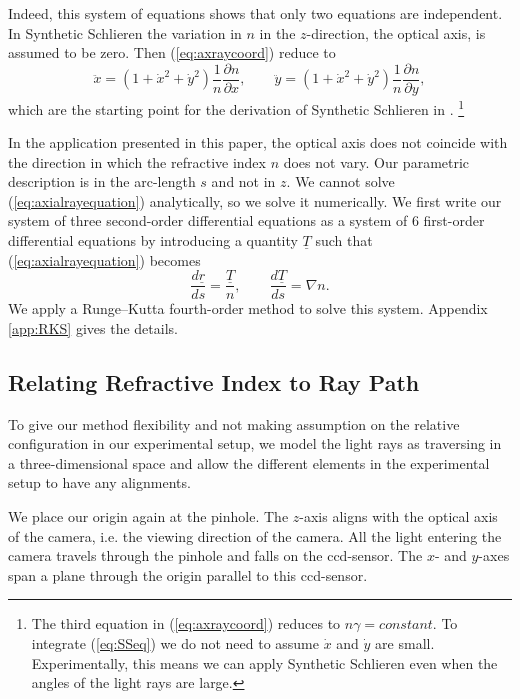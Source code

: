 \documentclass{article}
\begin{document}
Indeed, this system of equations shows that only two equations are independent. In Synthetic Schlieren the variation in $n$ in the $z$-direction, the optical axis, is assumed to be zero. Then (\ref{eq:axraycoord}) reduce to
\begin{equation}
	\label{eq:SSeq}
		\ddot{x} = \left(1+\dot{x}^2+\dot{y}^2\right) \frac{1}{n} \frac{\partial n}{\partial x}, \qquad
		\ddot{y} = \left(1+\dot{x}^2+\dot{y}^2\right) \frac{1}{n} \frac{\partial n}{\partial y},
\end{equation}
which are the starting point for the derivation of Synthetic Schlieren in \cite{dalziel2000whole}.  \footnote{The third equation in (\ref{eq:axraycoord}) reduces to $n \gamma = constant$.  To integrate (\ref{eq:SSeq}) we do not need to assume $\dot{x}$ and $\dot{y}$ are small. Experimentally, this means we can apply Synthetic Schlieren even when the angles of the light rays are large. }

In the application presented in this paper, the optical axis does not coincide with the direction in which the refractive index $n$ does not vary. Our parametric description is in the arc-length $s$ and not in $z$.  We cannot solve (\ref{eq:axialrayequation}) analytically, so we solve it numerically. We first write our system of three second-order differential equations as a system of 6 first-order differential equations by introducing a quantity $\underline{T}$ \cite{southwell1982ray} such that (\ref{eq:axialrayequation}) becomes
\begin{equation}
	\label{eq:sys6foeq}
		\frac{d \underline{r}}{d s} = \frac{\underline{T}}{n}, \qquad
		\frac{d \underline{T}}{d s} = \nabla n.
\end{equation}
We apply a Runge–Kutta fourth-order method to solve this system. Appendix \ref{app:RKS} gives the details.

\subsection{Relating Refractive Index to Ray Path}
\label{subsec:RayPath}
To give our method flexibility and not making assumption on the relative configuration in our experimental setup, we model the light rays as traversing in a three-dimensional space and allow the different elements in the experimental setup to have any alignments.

We place our origin again at the pinhole. The $z$-axis aligns with the optical axis of the camera, i.e. the viewing direction of the camera. All the light entering the camera travels through the pinhole and falls on the ccd-sensor. The $x$- and $y$-axes span a plane through the origin parallel to this ccd-sensor. 
\end{document}
